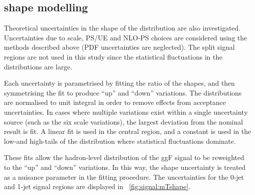 \subsection{\mt shape modelling}
\label{sec:ggF:mt}

Theoretical uncertainties in the shape of the \mt distribution are also investigated. 
Uncertainties due to scale, PS/UE and NLO-PS choices are considered using the methods 
described above (PDF uncertainties are neglected). The split signal regions are not used in 
this study since the statistical fluctuations in the \mt distributions are large.

Each uncertainty is parametrised by fitting the ratio of the \mt shapes, and then 
symmetrising the fit to produce ``up'' and ``down'' variations. The \mt distributions are 
normalised to unit integral in order to remove effects from acceptance uncertainties. 
In cases where multiple variations exist within a single uncertainty source (such as the 
six scale variations), the largest deviation from the nominal result is fit. A linear 
fit is used in the central \mt region, and a constant is used in the low-\mt and 
high-\mt tails of the distribution where statistical fluctuations dominate.

These fits allow the hadron-level \mt distribution of the ggF signal to be reweighted 
to the ``up'' and ``down'' variations. In this way, the \mt shape uncertainty is treated 
as a nuisance parameter in the \HWW fitting procedure. The uncertainties for the 0-jet 
and 1-jet signal regions are displayed in \Figure~\ref{fig:signal:mTshape}.

